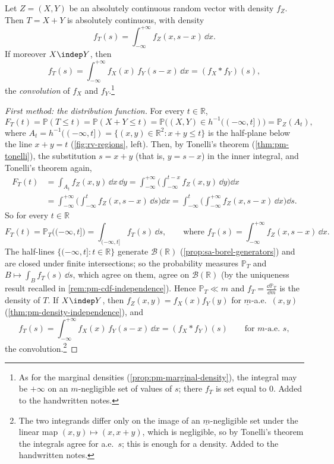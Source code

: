 \begin{proposition}\label{prop:rv-sum-density}
Let $Z=(X,Y)$ be an absolutely continuous random vector with density $f_Z$. Then $T=X+Y$ is
absolutely continuous, with density
\[
  f_T(s)=\int_{-\infty}^{+\infty}f_Z(x,s-x)\,\dd x .
\]
If moreover $X\indep Y$, then
\[
  f_T(s)=\int_{-\infty}^{+\infty}f_X(x)\,f_Y(s-x)\,\dd x=(f_X*f_Y)(s),
\]
the \emph{convolution} of $f_X$ and $f_Y$.\footnote{As for the marginal densities
(\cref{prop:pm-marginal-density}), the integral may be $+\infty$ on an $m$-negligible set of values
of $s$; there $f_T$ is set equal to $0$. Added to the handwritten notes.}
\end{proposition}

\begin{proof}[First method: the distribution function]
For every $t\in\mathbb R$,
\[
  F_T(t)=\mathbb P(T\le t)=\mathbb P(X+Y\le t)=\mathbb P\big((X,Y)\in h^{-1}((-\infty,t])\big)
  =\mathbb P_Z(A_t),
\]
where $A_t=h^{-1}((-\infty,t])=\{(x,y)\in\mathbb R^2:x+y\le t\}$ is the half-plane below the line
$x+y=t$ (\cref{fig:rv-regions}, left). Then, by Tonelli's theorem (\cref{thm:pm-tonelli}), the
substitution $s=x+y$ (that is, $y=s-x$) in the inner integral, and Tonelli's theorem again,
\[
\begin{aligned}
  F_T(t)&=\int_{A_t}f_Z(x,y)\,\dd x\,\dd y
  =\int_{-\infty}^{+\infty}\Big(\int_{-\infty}^{t-x}f_Z(x,y)\,\dd y\Big)\dd x\\
  &=\int_{-\infty}^{+\infty}\Big(\int_{-\infty}^{t}f_Z(x,s-x)\,\dd s\Big)\dd x
  =\int_{-\infty}^{t}\Big(\int_{-\infty}^{+\infty}f_Z(x,s-x)\,\dd x\Big)\dd s .
\end{aligned}
\]
So for every $t\in\mathbb R$
\[
  F_T(t)=\mathbb P_T\big((-\infty,t]\big)=\int_{(-\infty,t]}f_T(s)\,\dd s,\qquad\text{where }
  f_T(s)=\int_{-\infty}^{+\infty}f_Z(x,s-x)\,\dd x .
\]
The half-lines $\{(-\infty,t]:t\in\mathbb R\}$ generate $\mathcal B(\mathbb R)$
(\cref{prop:sa-borel-generators}) and are closed under finite intersections; so the probability
measures $\mathbb P_T$ and $B\mapsto\int_Bf_T(s)\,\dd s$, which agree on them, agree on
$\mathcal B(\mathbb R)$ (by the uniqueness result recalled in \cref{rem:pm-cdf-independence}). Hence
$\mathbb P_T\ll m$ and $f_T=\frac{\dd\mathbb P_T}{\dd m}$ is the density of $T$. If $X\indep Y$,
then $f_Z(x,y)=f_X(x)f_Y(y)$ for $\underline m$-a.e.\ $(x,y)$ (\cref{thm:pm-density-independence}), and
\[
  f_T(s)=\int_{-\infty}^{+\infty}f_X(x)\,f_Y(s-x)\,\dd x=(f_X*f_Y)(s)\qquad\text{for $m$-a.e.\ }s,
\]
the convolution.\footnote{The two integrands differ only on the image of an $\underline m$-negligible
set under the linear map $(x,y)\mapsto(x,x+y)$, which is negligible, so by Tonelli's theorem the
integrals agree for a.e.\ $s$; this is enough for a density. Added to the handwritten notes.}
\end{proof}

